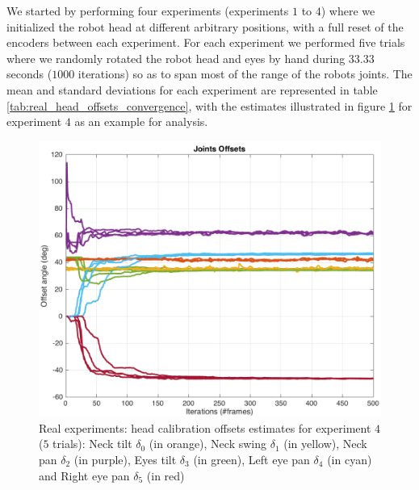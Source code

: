 We started by performing four experiments (experiments $1$ to $4$) where we initialized the robot head at different arbitrary positions, with a full reset of the encoders between each experiment. For each experiment we performed five trials where we randomly rotated the robot head and eyes by hand during $33.33$ seconds ($1000$ iterations) so as to span most of the range of the robots joints. The mean and standard deviations for each experiment are represented in table \ref{tab:real_head_offsets_convergence}, with the estimates illustrated in figure \ref{fig:head_offsets_convergence_real} for experiment $4$ as an example for analysis.

\begin{figure}
\includegraphics[width=0.975\columnwidth]{images/results/calibration_exp_4}
\caption{Real experiments: head calibration offsets estimates for experiment $4$ ($5$ trials): Neck tilt $\delta_0$ (in orange), Neck swing $\delta_1$ (in yellow), Neck pan $\delta_2$ (in purple), Eyes tilt $\delta_3$ (in green), Left eye pan $\delta_4$ (in cyan) and Right eye pan $\delta_5$ (in red)}
\label{fig:head_offsets_convergence_real}
\end{figure}

